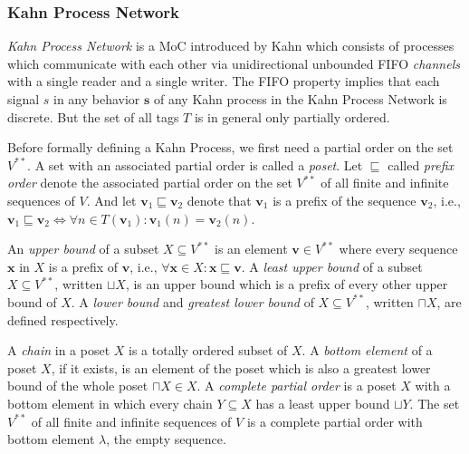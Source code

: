 
\subsubsection*{Kahn Process Network}

\emph{Kahn Process Network} is a MoC introduced by Kahn \cite{kahn:1974}
which consists of processes which communicate with each other via
unidirectional unbounded FIFO \emph{channels} with a  single reader and
a single writer. The FIFO property implies that each signal $s$ in any
behavior $\mathbf{s}$ of any Kahn process in the Kahn Process Network
is discrete. But the set of all tags $T$ is in general only partially ordered.

Before formally defining a Kahn Process, we first need a partial order on
the set $V^{**}$. A set with an associated partial order is called a
\emph{poset}. Let $\sqsubseteq$ called \emph{prefix order} denote the
associated partial order on the set $V^{**}$ of all finite and infinite sequences of $V$.
And let $\mathbf{v}_1 \sqsubseteq \mathbf{v}_2$ denote that
$\mathbf{v}_1$ is a prefix of the sequence $\mathbf{v}_2$, i.e.,
$\mathbf{v}_1 \sqsubseteq \mathbf{v}_2 \iff \forall{n \in T(\mathbf{v}_1)}: \mathbf{v}_1(n) = \mathbf{v}_2(n)$.

An \emph{upper bound} of a subset $X \subseteq V^{**}$ is an element
$\mathbf{v} \in V^{**}$ where every sequence $\mathbf{x}$ in $X$ is a
prefix of $\mathbf{v}$, i.e., $\forall{\mathbf{x} \in X}: \mathbf{x} \sqsubseteq \mathbf{v}$.
A \emph{least upper bound} of a subset $X \subseteq V^{**}$, written $\sqcup X$,
is an upper bound which is a prefix of every other upper bound of $X$.
A \emph{lower bound} and \emph{greatest lower bound} of $X \subseteq V^{**}$,
written $\sqcap X$, are defined respectively.

A \emph{chain} in a poset $X$ is a totally ordered subset of $X$. A
\emph{bottom element} of a poset $X$, if it exists, is an element of the
poset which is also a greatest lower bound of the whole poset $\sqcap X \in X$.
A \emph{complete partial order} is a poset $X$ with a bottom element
in which every chain $Y \subseteq X$ has a least upper bound
$\sqcup Y$. The set $V^{**}$ of all finite and infinite sequences of $V$
is a complete partial order with bottom element $\lambda$, the
empty sequence.

